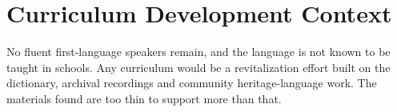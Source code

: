 \documentclass[12pt]{article}
\begin{document}
\section{Curriculum Development Context}
No fluent first-language speakers remain, and the language is not known to be taught in schools. Any curriculum would be a revitalization effort built on the dictionary, archival recordings and community heritage-language work. The materials found are too thin to support more than that.
\end{document}
